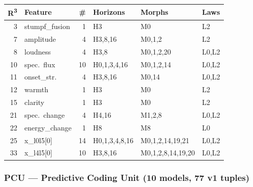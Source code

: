{\footnotesize
\begin{longtable}{@{}r l r l l l@{}}
\toprule
\textbf{R\textsuperscript{3}} & \textbf{Feature} & \textbf{\#}
  & \textbf{Horizons} & \textbf{Morphs} & \textbf{Laws} \\
\midrule
\endfirsthead
\midrule
\endhead
\endfoot
\bottomrule
\endlastfoot

\rowcolor{grpA}
3 & stumpf\_fusion & 1 & H3 & M0 & L2 \\
\rowcolor{grpB}
7 & amplitude & 4 & H3,8,16 & M0,1,2 & L2 \\
\rowcolor{grpB}
8 & loudness & 4 & H3,8 & M0,1,2,20 & L0,L2 \\
\rowcolor{grpB}
10 & spec.~flux & 10 & H0,1,3,4,16 & M0,1,2,14 & L0,L2 \\
\rowcolor{grpB}
11 & onset\_str. & 4 & H3,8,16 & M0,14 & L0,L2 \\
\rowcolor{grpC}
12 & warmth & 1 & H3 & M0 & L2 \\
\rowcolor{grpC}
15 & clarity & 1 & H3 & M0 & L2 \\
\rowcolor{grpD}
21 & spec.~change & 4 & H4,16 & M1,2,8 & L0,L2 \\
\rowcolor{grpD}
22 & energy\_change & 1 & H8 & M8 & L0 \\
\rowcolor{grpE}
25 & x\_l0l5[0] & 14 & H0,1,3,4,8,16 & M0,1,2,14,19,21 & L0,L2 \\
\rowcolor{grpE}
33 & x\_l4l5[0] & 10 & H3,8,16 & M0,1,2,8,14,19,20 & L0,L2 \\
\end{longtable}
}


\subsubsection*{PCU --- Predictive Coding Unit (10 models, 77 v1 tuples)}

